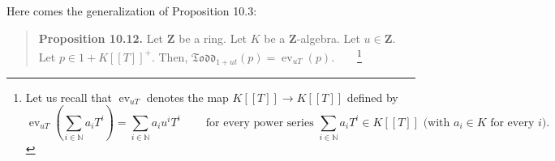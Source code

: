 \documentclass[numbers=enddot,12pt,final,onecolumn,notitlepage]{scrartcl}%
\begin{document}
Here comes the generalization of Proposition 10.3:

\begin{quote}
\textbf{Proposition 10.12.} Let $\mathbf{Z}$ be a ring. Let $K$ be a
$\mathbf{Z}$-algebra. Let $u\in\mathbf{Z}$. Let $p\in1+K\left[  \left[
T\right]  \right]  ^{+}$. Then, $\mathfrak{Todd}_{1+ut}\left(  p\right)
=\operatorname*{ev}\nolimits_{uT}\left(  p\right)  $.\ \ \ \ \footnote{Let us
recall that $\operatorname*{ev}\nolimits_{uT}$ denotes the map $K\left[
\left[  T\right]  \right]  \rightarrow K\left[  \left[  T\right]  \right]  $
defined by%
\[
\operatorname*{ev}\nolimits_{uT}\left(  \sum\limits_{i\in\mathbb{N}}a_{i}%
T^{i}\right)  =\sum\limits_{i\in\mathbb{N}}a_{i}u^{i}T^{i}%
\ \ \ \ \ \ \ \ \ \ \text{for every power series }\sum\limits_{i\in\mathbb{N}%
}a_{i}T^{i}\in K\left[  \left[  T\right]  \right]  \text{ (with }a_{i}\in
K\text{ for every }i\text{).}%
\]
}
\end{quote}
\end{document}

